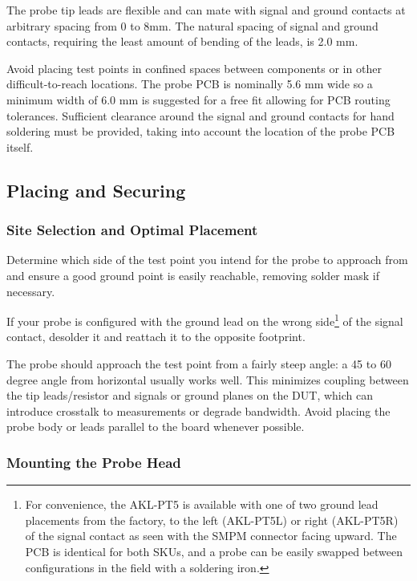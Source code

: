 \documentclass[11pt]{article}
\begin{document}
The probe tip leads are flexible and can mate with signal and ground contacts at arbitrary spacing from 0 to 8mm. The
natural spacing of signal and ground contacts, requiring the least amount of bending of the leads, is 2.0 mm.

Avoid placing test points in confined spaces between components or in other difficult-to-reach locations. The probe PCB
is nominally 5.6 mm wide so a minimum width of 6.0 mm is suggested for a free fit allowing for PCB routing tolerances.
Sufficient clearance around the signal and ground contacts for hand soldering must be provided, taking into account the
location of the probe PCB itself.


\subsection{Placing and Securing}

\subsubsection{Site Selection and Optimal Placement}

Determine which side of the test point you intend for the probe to approach from and ensure a good ground point is
easily reachable, removing solder mask if necessary.

If your probe is configured with the ground lead on the wrong side\footnote{For convenience, the AKL-PT5 is available
with one of two ground lead placements from the factory, to the left (AKL-PT5L) or right (AKL-PT5R) of the signal
contact as seen with the SMPM connector facing upward. The PCB is identical for both SKUs, and a probe can be easily
swapped between configurations in the field with a soldering iron.} of the signal contact, desolder it and reattach it
to the opposite footprint.

The probe should approach the test point from a fairly steep angle: a 45 to 60 degree angle from horizontal usually
works well. This minimizes coupling between the tip leads/resistor and signals or ground planes on the DUT, which can
introduce crosstalk to measurements or degrade bandwidth. Avoid placing the probe body or leads parallel to the board
whenever possible.

\subsubsection{Mounting the Probe Head}
\end{document}
